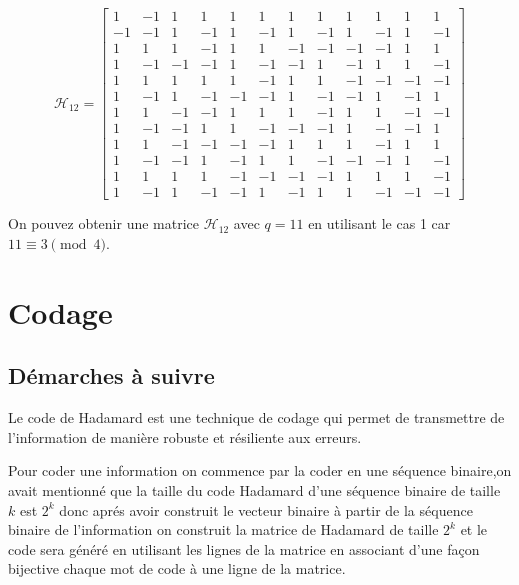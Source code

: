 \documentclass{article}
\begin{document}
\setcounter{MaxMatrixCols}{20}

\begin{equation*}
	\mathcal{H}_{12}
	=
	\begin{bmatrix}
		1  & -1 & 1  & 1  & 1  & 1  & 1 & 1  & 1   &  1 & 1  & 1  \\
		-1 & -1 & 1  & -1 & 1  & -1 & 1 & -1 & 1   & -1 & 1  & -1 \\
		1  & 1  & 1  & -1 & 1  & 1  & -1 & -1 & -1 & -1 & 1  & 1  \\
		1  & -1 & -1 & -1 & 1  & -1 & -1 & 1  & -1 & 1  & 1  & -1 \\
		1  & 1  & 1  & 1  & 1  & -1 & 1  & 1  & -1 & -1 & -1 & -1 \\
		1  & -1 & 1  & -1 & -1 & -1 & 1  & -1 & -1 & 1  & -1 & 1  \\
		1  & 1  & -1 & -1 & 1  & 1  & 1  & -1 & 1  & 1  & -1 & -1 \\
		1  & -1 & -1 & 1  & 1  & -1 & -1 & -1 & 1  & -1 & -1 & 1  \\
		1  & 1  & -1 & -1 & -1 & -1 & 1  & 1  & 1  & -1 & 1  & 1  \\
		1  & -1 & -1 & 1  & -1 & 1  & 1  & -1 & -1 & -1 & 1  & -1 \\
		1  & 1  & 1  & 1  & -1 & -1 & -1 & -1 & 1  & 1  & 1  & -1 \\
		1  & -1 & 1  & -1 & -1 & 1  & -1 & 1  & 1  & -1 & -1 & -1
	\end{bmatrix}
\end{equation*}

On pouvez obtenir une matrice $\mathcal{H}_{12}$ avec $q = 11$ en utilisant le cas 1 
car $11 \equiv 3 \pmod{4}$.

\section{Codage}

\subsection{Démarches à suivre}

Le code de Hadamard est une technique de codage qui permet de transmettre
de l'information de manière robuste et résiliente aux erreurs.

Pour coder une information on commence par la coder en une séquence binaire,on avait 
mentionné que la taille du code Hadamard d'une séquence binaire 
de taille $k$ est $2^k$ donc aprés avoir construit le vecteur binaire à 
partir de la séquence binaire de l'information on construit la matrice de
Hadamard de taille $2^k$ et le code sera généré en utilisant les lignes de la matrice en 
associant d'une façon bijective chaque mot de code à une ligne de la matrice.
\end{document}

